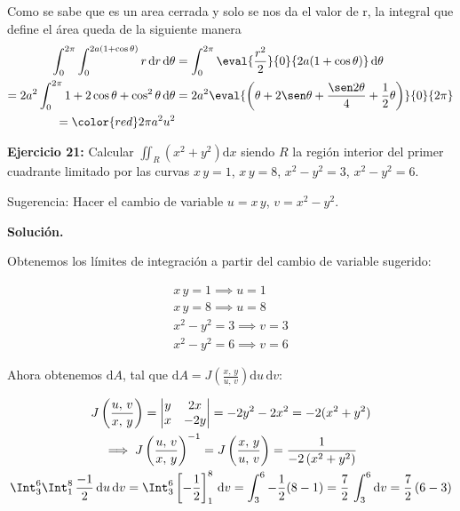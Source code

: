 \documentclass[12pt]{article}
\DeclareMathOperator{\di}{d\!}
\begin{document}
Como se sabe que es un area cerrada y solo se nos da el valor de r, la integral que define 
el área queda de la siguiente manera
\begin{align*}
	\int_0^{2\pi} \int_0^{2a(1+\cos\theta)} r \di r \di \theta 
	&= \int_0^{2\pi} \eval{\frac{r^2}{2}}{0}{2a(1 + \cos\theta)} \di \theta \\
	=2a^2 \int_0^{2\pi} 1 + 2 \cos\theta + \cos^2\theta \di \theta 
	&= 2a^2 \eval{\left(\theta + 2\sen \theta + \frac{\sen2\theta}{4}
	+ \frac{1}{2} \theta\right)}{0}{2\pi} \\
	= \color{red} 2\pi a^2 u^2  
\end{align*}

\noindent \textbf{Ejercicio 21:} Calcular $\iint_R (x^2 + y^2) \mathrm{d}x$ siendo $R$ la región interior del primer cuadrante limitado por las curvas $x\,y=1$, $x\,y=8$, $x^2-y^2=3$, $x^2-y^2=6$.

Sugerencia: Hacer el cambio de variable $u = x\,y$, $v=x^2-y^2$.

\vspace{5mm}

\noindent \textbf{Solución.}

\vspace{3mm}

\noindent Obtenemos los límites de integración a partir del cambio de variable sugerido:

\begin{gather*}
	x\,y=1 \implies u = 1 \\
	x\,y=8 \implies u = 8 \\
	x^2-y^2=3 \implies v = 3 \\
	x^2-y^2=6 \implies v = 6
\end{gather*}

\noindent Ahora obtenemos $\mathrm{d}A$, tal que $\mathrm{d}A = J\left(\frac{x,\,y}{u,\,v}\right) \mathrm{d}u\,\mathrm{d}v$:

\begin{gather*}
	J\left(\frac{u,\,v}{x,\,y}\right) = 
	\begin{vmatrix}
		y & 2x \\
		x & -2y
	\end{vmatrix} = -2y^2-2x^2 = -2(x^2+y^2) \\
	\implies J\left(\frac{u,\,v}{x,\,y}\right)^{-1} = J\left(\frac{x,\,y}{u,\,v}\right) = \frac{1}{-2\left(x^2+y^2\right)} \\
	\Int_3^6 \Int_1^8 \, \frac{-1}{2}\,\mathrm{d}u\,\mathrm{d}v = \Int_3^6 \left[-\frac{1}{2}\right]_1^8 \, \mathrm{d}v = \int_3^6 -\frac{1}{2} (8 - 1) = \frac{7}{2} \, \int_3^6 \mathrm{d}v = \frac{7}{2}\,(6-3)
\end{gather*}
\end{document}
